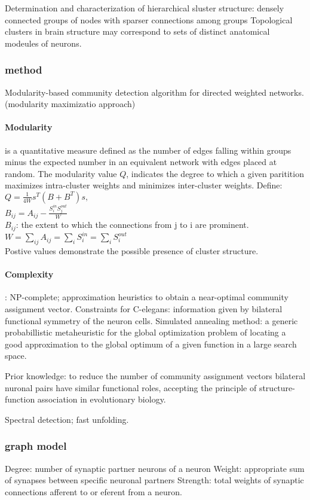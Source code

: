 Determination and characterization of hierarchical sluster structure: densely connected groups of nodes with sparser connections among groups
Topological clusters in brain structure may correspond to sets of distinct anatomical modeules of neurons.

\subsubsection{method} 
Modularity-based community detection algorithm for directed weighted networks. (modularity maximizatio approach)
\paragraph{Modularity}
is a quantitative measure defined as the number of edges falling within groups minus the expected number in an equivalent network with edges placed at random.
The modularity value $Q$, indicates the degree to which a given paritition maximizes intra-cluster weights and minimizes inter-cluster weights. Define:
$Q=\frac{1}{4W} s^{T}(B + B^{T})s,$ \\
$B_{ij} = A_{ij} - \frac{S_i^{in} S_j^{out}}{W} $ \\
$B_{ij}$: the extent to which the connections from j to i are prominent. \\
$W = \sum_{ij} A_{ij} = \sum_i S_i^{in} = \sum_i S_i^{out}$
\\
Postive values demonstrate the possible presence of cluster structure.

\paragraph{Complexity}:
 NP-complete; approximation heuristics to obtain a near-optimal community assignment vector.
Constraints for C-elegans: information given by bilateral functional symmetry of the neuron cells.
Simulated annealing method: a generic probabillistic metaheuristic for the global optimization problem of locating a good approximation to the global optimum of a given
function in a large search space.

Prior knowledge: to reduce the number of community assignment vectors
bilateral nuronal pairs have similar functional roles, accepting the principle of structure-function association in evolutionary biology.

Spectral detection; fast unfolding.

\subsubsection{graph model}
Degree: number of synaptic partner neurons of a neuron
Weight: appropriate sum of synapses between specific neuronal partners
Strength: total weights of synaptic connections afferent to or eferent from a neuron.

